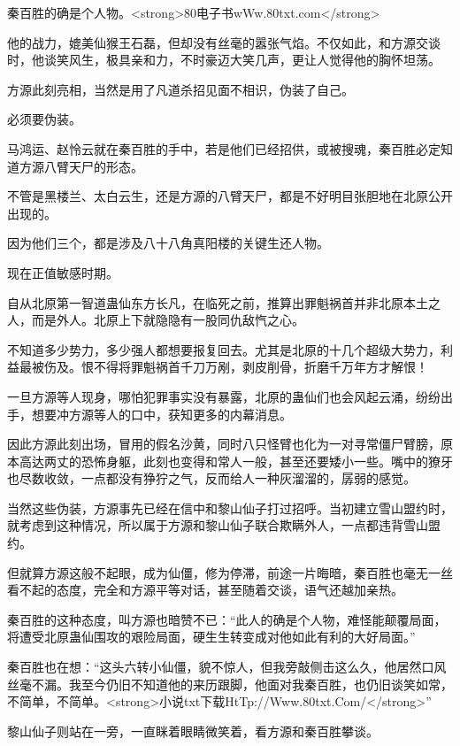 
\begin{this_body}

秦百胜的确是个人物。<strong>80电子书wWw.80txt.com</strong>

他的战力，媲美仙猴王石磊，但却没有丝毫的嚣张气焰。不仅如此，和方源交谈时，他谈笑风生，极具亲和力，不时豪迈大笑几声，更让人觉得他的胸怀坦荡。

方源此刻亮相，当然是用了凡道杀招见面不相识，伪装了自己。

必须要伪装。

马鸿运、赵怜云就在秦百胜的手中，若是他们已经招供，或被搜魂，秦百胜必定知道方源八臂天尸的形态。

不管是黑楼兰、太白云生，还是方源的八臂天尸，都是不好明目张胆地在北原公开出现的。

因为他们三个，都是涉及八十八角真阳楼的关键生还人物。

现在正值敏感时期。

自从北原第一智道蛊仙东方长凡，在临死之前，推算出罪魁祸首并非北原本土之人，而是外人。北原上下就隐隐有一股同仇敌忾之心。

不知道多少势力，多少强人都想要报复回去。尤其是北原的十几个超级大势力，利益最被伤及。恨不得将罪魁祸首千刀万剐，剥皮削骨，折磨千万年方才解恨！

一旦方源等人现身，哪怕犯罪事实没有暴露，北原的蛊仙们也会风起云涌，纷纷出手，想要冲方源等人的口中，获知更多的内幕消息。

因此方源此刻出场，冒用的假名沙黄，同时八只怪臂也化为一对寻常僵尸臂膀，原本高达两丈的恐怖身躯，此刻也变得和常人一般，甚至还要矮小一些。嘴中的獠牙也尽数收敛，一点都没有狰狞之气，反而给人一种灰溜溜的，孱弱的感觉。

当然这些伪装，方源事先已经在信中和黎山仙子打过招呼。当初建立雪山盟约时，就考虑到这种情况，所以属于方源和黎山仙子联合欺瞒外人，一点都违背雪山盟约。

但就算方源这般不起眼，成为仙僵，修为停滞，前途一片晦暗，秦百胜也毫无一丝看不起的态度，完全和方源平等对话，甚至随着交谈，语气还越加亲热。

秦百胜的这种态度，叫方源也暗赞不已：“此人的确是个人物，难怪能颠覆局面，将遭受北原蛊仙围攻的艰险局面，硬生生转变成对他如此有利的大好局面。”

秦百胜也在想：“这头六转小仙僵，貌不惊人，但我旁敲侧击这么久，他居然口风丝毫不漏。我至今仍旧不知道他的来历跟脚，他面对我秦百胜，也仍旧谈笑如常，不简单，不简单。<strong>小说txt下载HtTp://Www.80txt.Com/</strong>”

黎山仙子则站在一旁，一直眯着眼睛微笑着，看方源和秦百胜攀谈。


\end{this_body}
